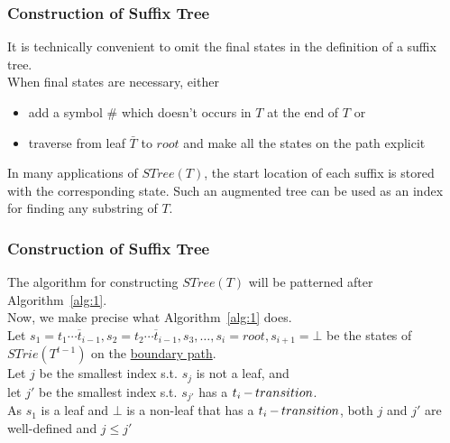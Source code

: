 \documentclass[compress,usenames,dvipsnames]{beamer}
\DeclareMathOperator{\atrans}{\mathnormal{-}}
\begin{document}
			\begin{frame}\frametitle{Construction of Suffix Tree}
				It is technically convenient to omit the final states in the definition of a suffix tree. \\
				When final states are necessary, either \\
				\begin{itemize}
					\item add a symbol $\#$ which doesn't occurs in $T$ at the end of $T$ or 
					\item traverse from leaf $\bar{T}$ to $root$ and make all the states on the path explicit
				\end{itemize}
                In many applications of $STree(T)$, the start location of each suffix is stored with the corresponding state. Such an augmented tree can be used as an index for finding any substring of $T$.
			\end{frame}

			\begin{frame}\frametitle{Construction of Suffix Tree}
                The algorithm for constructing $STree(T)$ will be patterned after Algorithm~\ref{alg:1}. \\
                Now, we make precise what Algorithm~\ref{alg:1} does. \\
                \hfill \break
                Let $s_1 = \overline{t_1\cdots t_{i-1}},s_2=\overline{t_2\cdots t_{i-1}},s_3,\ldots,s_i=root,s_{i+1}=\bot$ be the states of $STrie(T^{t-1})$ on the \underline{boundary path}. \\
                \hfill \break
                Let $j$ be the smallest index s.t. $s_j$ is not a leaf, and \\
				let $j'$ be the smallest index s.t. $s_{j'}$ has a $t_i\atrans transition$. \\
				\hfill \break
				As $s_1$ is a leaf and $\bot$ is a non-leaf that has a $t_i \atrans transition$, both $j$ and $j'$ are well-defined and $j \leq j'$
            \end{frame}
\end{document}
